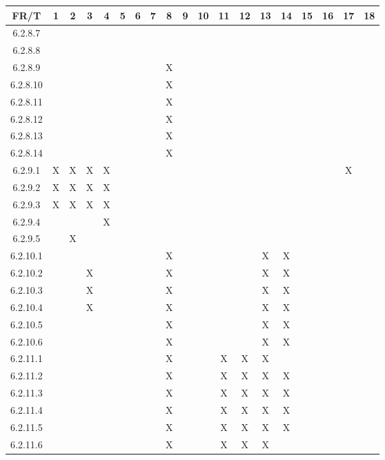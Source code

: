 \documentclass[12pt, titlepage]{article}
\begin{document}
\begin{tabular}{|c|c|c|c|c|c|c|c|c|c|c|c|c|c|c|c|c|c|c|}
    \hline
    FR/T &1 &2 &3 &4 &5 &6 &7 &8 &9 &10 &11 &12 &13 &14 &15 &16 &17 &18 \\
    \hline
     6.2.8.7 & & & & & & & & & & & & & & & & & & \\
     6.2.8.8 & & & & & & & & & & & & & & & & & & \\
     6.2.8.9 & & & & & & & &X & & & & & & & & & & \\
     6.2.8.10 & & & & & & & &X & & & & & & & & & & \\
     6.2.8.11 & & & & & & & &X & & & & & & & & & & \\
     6.2.8.12 & & & & & & & &X & & & & & & & & & & \\
     6.2.8.13 & & & & & & & &X & & & & & & & & & & \\
     6.2.8.14 & & & & & & & &X & & & & & & & & & & \\
     6.2.9.1 &X &X &X &X & & & & & & & & & & & & &X & \\
     6.2.9.2 &X &X &X &X & & & & & & & & & & & & & & \\
     6.2.9.3 &X &X &X &X & & & & & & & & & & & & & & \\
     6.2.9.4 & & & &X & & & & & & & & & & & & & & \\
     6.2.9.5 & &X & & & & & & & & & & & & & & & & \\
     6.2.10.1 & & & & & & & &X & & & & &X &X & & & & \\
     6.2.10.2 & & &X & & & & &X & & & & &X &X & & & & \\
     6.2.10.3 & & &X & & & & &X & & & & &X &X & & & & \\
     6.2.10.4 & & &X & & & & &X & & & & &X &X & & & & \\
     6.2.10.5 & & & & & & & &X & & & & &X &X & & & & \\
     6.2.10.6 & & & & & & & &X & & & & &X &X & & & & \\
     6.2.11.1 & & & & & & & &X & & &X &X &X & & & & & \\
     6.2.11.2 & & & & & & & &X & & &X &X &X &X & & & & \\
     6.2.11.3 & & & & & & & &X & & &X &X &X &X & & & & \\
     6.2.11.4 & & & & & & & &X & & &X &X &X &X & & & & \\
     6.2.11.5 & & & & & & & &X & & &X &X &X &X & & & & \\
     6.2.11.6 & & & & & & & &X & & &X &X &X & & & & & \\
     \hline
\end{tabular}  
\end{document}
